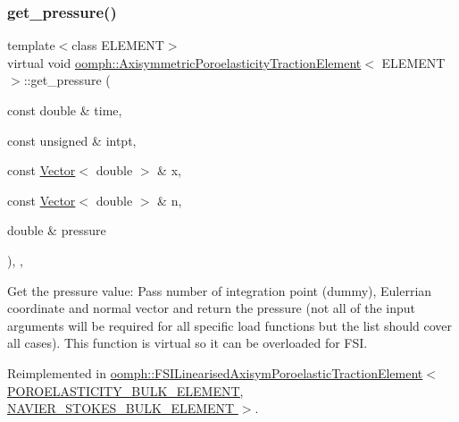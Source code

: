 \mbox{\label{classoomph_1_1AxisymmetricPoroelasticityTractionElement_a1b4adcf0b886054a3d51e0b2910ddbda}} 
\subsubsection{\texorpdfstring{get\+\_\+pressure()}{get\_pressure()}}
{\footnotesize\ttfamily template$<$class E\+L\+E\+M\+E\+NT$>$ \\
virtual void \hyperlink{classoomph_1_1AxisymmetricPoroelasticityTractionElement}{oomph\+::\+Axisymmetric\+Poroelasticity\+Traction\+Element}$<$ E\+L\+E\+M\+E\+NT $>$\+::get\+\_\+pressure (\begin{DoxyParamCaption}\item[{const double \&}]{time,  }\item[{const unsigned \&}]{intpt,  }\item[{const \hyperlink{classoomph_1_1Vector}{Vector}$<$ double $>$ \&}]{x,  }\item[{const \hyperlink{classoomph_1_1Vector}{Vector}$<$ double $>$ \&}]{n,  }\item[{double \&}]{pressure }\end{DoxyParamCaption})\hspace{0.3cm}{\ttfamily [inline]}, {\ttfamily [protected]}, {\ttfamily [virtual]}}



Get the pressure value\+: Pass number of integration point (dummy), Eulerrian coordinate and normal vector and return the pressure (not all of the input arguments will be required for all specific load functions but the list should cover all cases). This function is virtual so it can be overloaded for F\+SI. 



Reimplemented in \hyperlink{classoomph_1_1FSILinearisedAxisymPoroelasticTractionElement_a400115007925a62448e741cad2697472}{oomph\+::\+F\+S\+I\+Linearised\+Axisym\+Poroelastic\+Traction\+Element$<$ P\+O\+R\+O\+E\+L\+A\+S\+T\+I\+C\+I\+T\+Y\+\_\+\+B\+U\+L\+K\+\_\+\+E\+L\+E\+M\+E\+N\+T, N\+A\+V\+I\+E\+R\+\_\+\+S\+T\+O\+K\+E\+S\+\_\+\+B\+U\+L\+K\+\_\+\+E\+L\+E\+M\+E\+N\+T $>$}.



